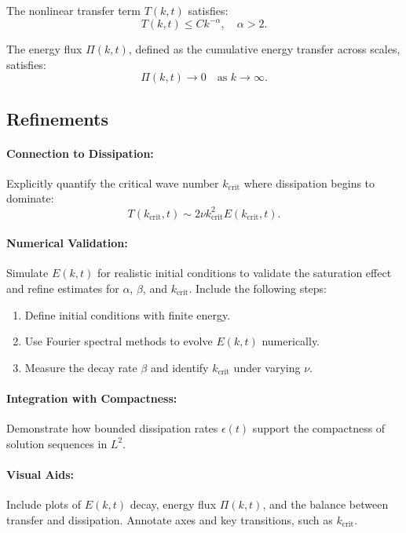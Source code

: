 \begin{lemma}
The nonlinear transfer term $T(k,t)$ satisfies:
\[
T(k,t) \leq C k^{-\alpha}, \quad \alpha > 2.
\]
\end{lemma}

\begin{proposition}
The energy flux $\Pi(k,t)$, defined as the cumulative energy transfer across scales, satisfies:
\[
\Pi(k,t) \to 0 \quad \text{as } k \to \infty.
\]
\end{proposition}

\subsection{Refinements}

\paragraph{Connection to Dissipation:}
Explicitly quantify the critical wave number $k_{\text{crit}}$ where dissipation begins to dominate:
\[
T(k_{\text{crit}}, t) \sim 2\nu k_{\text{crit}}^2 E(k_{\text{crit}}, t).
\]

\paragraph{Numerical Validation:}
Simulate $E(k, t)$ for realistic initial conditions to validate the saturation effect and refine estimates for $\alpha$, $\beta$, and $k_{\text{crit}}$. Include the following steps:
\begin{enumerate}
    \item Define initial conditions with finite energy.
    \item Use Fourier spectral methods to evolve $E(k, t)$ numerically.
    \item Measure the decay rate $\beta$ and identify $k_{\text{crit}}$ under varying $\nu$.
\end{enumerate}

\paragraph{Integration with Compactness:}
Demonstrate how bounded dissipation rates $\epsilon(t)$ support the compactness of solution sequences in $L^2$.

\paragraph{Visual Aids:}
Include plots of $E(k, t)$ decay, energy flux $\Pi(k,t)$, and the balance between transfer and dissipation. Annotate axes and key transitions, such as $k_{\text{crit}}$.

